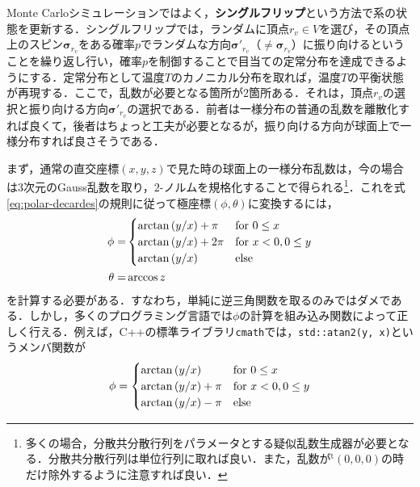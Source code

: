 \documentclass[a4,10pt, platex, dvipdfmx]{jsarticle}
\newcommand{\spin}{\bm{\sigma}}
\begin{document}
    Monte Carloシミュレーションではよく，\textbf{シングルフリップ}という方法で系の状態を更新する．シングルフリップでは，ランダムに頂点$ r_{v} \in V $を選び，その頂点上のスピン$\spin_{r_{v}}$をある確率$ p $でランダムな方向$\spin'_{r_{v}}$（$\neq \spin_{r_{v}}$）に振り向けるということを繰り返し行い，確率$ p $を制御することで目当ての定常分布を達成できるようにする．定常分布として温度$T$のカノニカル分布を取れば，温度$T$の平衡状態が再現する．ここで，乱数が必要となる箇所が2箇所ある．それは，頂点$ r_{v} $の選択と振り向ける方向$\spin'_{r_{v}}$の選択である．前者は一様分布の普通の乱数を離散化すれば良くて，後者はちょっと工夫が必要となるが，振り向ける方向が球面上で一様分布すれば良さそうである．

    まず，通常の直交座標$(x, y, z)$で見た時の球面上の一様分布乱数は，今の場合は3次元のGauss乱数を取り，$2$-ノルムを規格化することで得られる\footnote{多くの場合，分散共分散行列をパラメータとする疑似乱数生成器が必要となる．分散共分散行列は単位行列に取れば良い．また，乱数が${}^{\mathrm{t}} (0, 0, 0) $の時だけ除外するように注意すれば良い．}．これを式\eqref{eq:polar-decardes}の規則に従って極座標$\left(\phi, \theta\right)$に変換するには，
    \begin{align}
        \phi = &
        \begin{cases}
            \arctan \left( y / x \right) + \pi & \text{for $ 0 \leq x $}\\
            \arctan \left( y / x \right) + 2\pi & \text{for $ x < 0, 0 \leq y $}\\
            \arctan \left( y / x \right) & \text{else}
        \end{cases}\\
        \theta = & \arccos z
    \end{align}
    を計算する必要がある．すなわち，単純に逆三角関数を取るのみではダメである．しかし，多くのプログラミング言語では$\phi$の計算を組み込み関数によって正しく行える．例えば，C++の標準ライブラリ\texttt{cmath}では，\texttt{std::atan2(y, x)}というメンバ関数が
    \begin{align}
        \phi = 
        \begin{cases}
            \arctan \left( y / x \right)  & \text{for $ 0 \leq x $}\\
            \arctan \left( y / x \right) + \pi & \text{for $ x < 0, 0 \leq y $}\\
            \arctan \left( y / x \right) - \pi & \text{else}
        \end{cases}
    \end{align}
\end{document}
